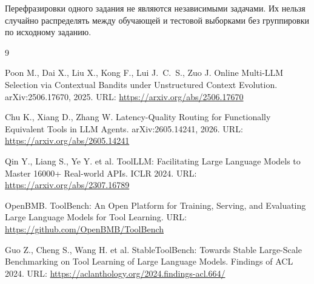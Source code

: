 \documentclass[12pt,a4paper]{article}
\begin{document}
Перефразировки одного задания не являются независимыми задачами. Их нельзя
случайно распределять между обучающей и тестовой выборками без группировки по
исходному заданию.

\begin{thebibliography}{9}

Poon M., Dai X., Liu X., Kong F., Lui J.~C.~S., Zuo J.
Online Multi-LLM Selection via Contextual Bandits under Unstructured Context
Evolution. arXiv:2506.17670, 2025.
URL: \url{https://arxiv.org/abs/2506.17670}

Chu K., Xiang D., Zhang W.
Latency-Quality Routing for Functionally Equivalent Tools in LLM Agents.
arXiv:2605.14241, 2026.
URL: \url{https://arxiv.org/abs/2605.14241}

Qin Y., Liang S., Ye Y. et al.
ToolLLM: Facilitating Large Language Models to Master 16000+ Real-world APIs.
ICLR 2024.
URL: \url{https://arxiv.org/abs/2307.16789}

OpenBMB. ToolBench: An Open Platform for Training, Serving, and Evaluating
Large Language Models for Tool Learning.
URL: \url{https://github.com/OpenBMB/ToolBench}

Guo Z., Cheng S., Wang H. et al.
StableToolBench: Towards Stable Large-Scale Benchmarking on Tool Learning of
Large Language Models. Findings of ACL 2024.
URL: \url{https://aclanthology.org/2024.findings-acl.664/}

\end{thebibliography}
\end{document}
